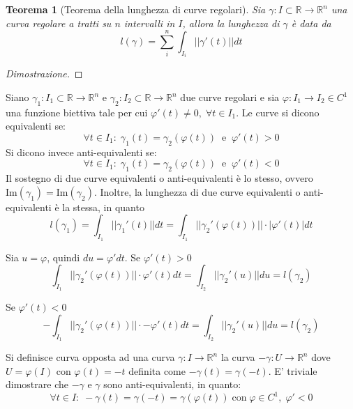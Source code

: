 \documentclass{article}
\newtheorem{theorem}{Teorema}
\begin{document}
            \vspace{10pt}
            \begin{theorem}[Teorema della lunghezza di curve regolari]
                Sia $\gamma: I \subset \mathbb{R} \rightarrow \mathbb{R}^{n}$ una curva regolare a tratti su $n$ intervalli in $I$, allora la lunghezza di $\gamma$ è data da
                \[
                    l(\gamma) = \sum_{i}^{n} \int_{I_i} ||\gamma'(t)|| dt
                \]
            \end{theorem}
            \begin{proof}[Dimostrazione]

            \end{proof}

            Siano $\gamma_1: I_1 \subset \mathbb{R} \rightarrow \mathbb{R}^{n}$ e $\gamma_2: I_2 \subset \mathbb{R} \rightarrow \mathbb{R}^{n}$ due curve regolari e sia $\varphi: I_{1} \rightarrow I_{2} \in C^{1}$ una funzione biettiva tale per cui $\varphi'(t) \neq 0, \; \forall t \in I_{1}$.
            Le curve si dicono equivalenti se:
            \[
                \forall t \in I_{1}: \; \gamma_{1}(t) = \gamma_{2}(\varphi(t)) \;\; \text{e} \;\; \varphi'(t) > 0
            \]
            Si dicono invece anti-equivalenti se:
            \[
                \forall t \in I_{1}: \; \gamma_{1}(t) = \gamma_{2}(\varphi(t)) \;\; \text{e} \;\; \varphi'(t) < 0
            \]
            Il sostegno di due curve equivalenti o anti-equivalenti è lo stesso, ovvero $\text{Im}(\gamma_{1}) = \text{Im}(\gamma_{2})$.
            Inoltre, la lunghezza di due curve equivalenti o anti-equivalenti è la stessa, in quanto
            \[
                l(\gamma_{1}) = \int_{I_{1}} || \gamma_{1}'(t) || dt = \int_{I_{1}} || \gamma_{2}'(\varphi(t)) || \cdot |\varphi'(t)| dt
            \]

            Sia $u = \varphi$, quindi $du = \varphi' dt$. Se $\varphi'(t) > 0$ 
            \[
                \int_{I_{1}} || \gamma_{2}'(\varphi(t)) || \cdot \varphi'(t) dt = \int_{I_{2}} || \gamma_{2}'(u) || du = l(\gamma_{2})
            \]

            Se $\varphi'(t) < 0$
            \[
                -\int_{I_{1}} || \gamma_{2}'(\varphi(t)) || \cdot -\varphi'(t) dt = \int_{I_{2}} || \gamma_{2}'(u) || du = l(\gamma_{2})
            \]


            \vspace{10pt}
            Si definisce curva opposta ad una curva $\gamma: I \rightarrow \mathbb{R}^{n}$ la curva $-\gamma: U \rightarrow \mathbb{R}^{n}$ dove $U = \varphi(I)$ con $\varphi(t) = -t$ definita come $-\gamma(t) = \gamma(-t)$. 
            E' triviale dimostrare che $-\gamma$ e $\gamma$ sono anti-equivalenti, in quanto:
            \[
                \forall t \in I: \; -\gamma(t) = \gamma(-t) = \gamma(\varphi(t)) \; \text{con} \; \varphi \in C^{1}, \; \varphi' < 0
            \]
\end{document}
